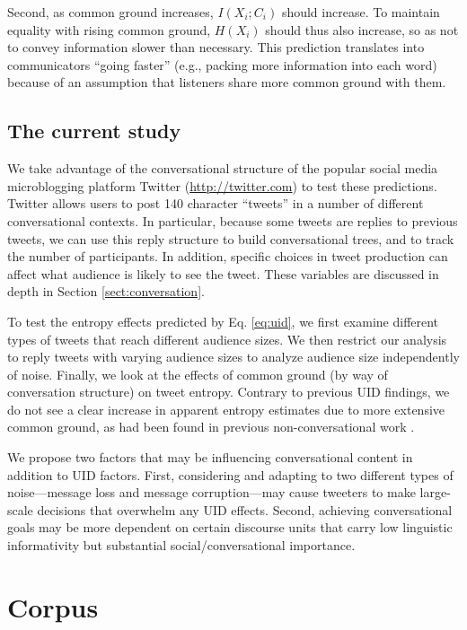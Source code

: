 \documentclass[11pt,letterpaper]{article}
\begin{document}
Second, as common ground increases, $I(X_i;C_i)$ should increase. To maintain equality with rising common ground, $H(X_i)$ should thus also increase, so as not to convey information slower than necessary. This prediction translates into communicators ``going faster'' (e.g., packing more information into each word) because of an assumption that listeners share more common ground with them.

\subsection{The current study}

We take advantage of the conversational structure of the popular social media microblogging platform Twitter (\url{http://twitter.com}) to test these predictions.  Twitter allows users to post 140 character ``tweets'' in a number of different conversational contexts. In particular,  because some tweets are replies to previous tweets, we can use this reply structure to build conversational trees, and to track the number of participants.  In addition, specific choices in tweet production can affect what audience is likely to see the tweet.  These variables are discussed in depth in Section \ref{sect:conversation}.

To test the entropy effects predicted by Eq. \ref{eq:uid}, we first examine different types of tweets that reach different audience sizes.  We then restrict our analysis to reply tweets with varying audience sizes to analyze audience size independently of noise.  Finally, we look at the effects of common ground (by way of conversation structure) on tweet entropy. Contrary to previous UID findings, we do not see a clear increase in apparent entropy estimates due to more extensive common ground, as had been found in previous non-conversational work \cite{genzel2002,qian2012,doyle2015}.  

We propose two factors that may be influencing conversational content in addition to UID factors.  First, considering and adapting to two different types of noise---message loss and message corruption---may cause tweeters to make large-scale decisions that overwhelm any UID effects.  Second, achieving conversational goals may be more dependent on certain discourse units that carry low linguistic informativity but substantial social/conversational importance.

\section{Corpus}
\end{document}
